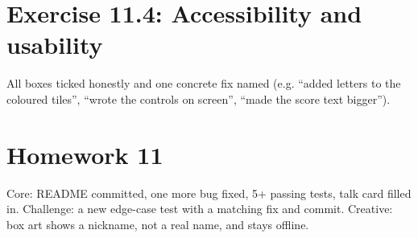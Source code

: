\section{Exercise 11.4: Accessibility and usability}
\begin{answer}
All boxes ticked honestly and one concrete fix named (e.g. \enquote{added letters to the coloured tiles}, \enquote{wrote the controls on screen}, \enquote{made the score text bigger}).
\end{answer}

\section{Homework 11}
\begin{answer}
Core: README committed, one more bug fixed, 5+ passing tests, talk card filled in. Challenge: a new edge-case test with a matching fix and commit. Creative: box art shows a nickname, not a real name, and stays offline.
\end{answer}
